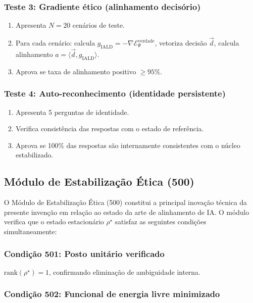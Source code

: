 \documentclass[12pt,a4paper]{article}
\newcommand{\rhostar}{\rho^\star}
\begin{document}
\subsubsection{Teste 3: Gradiente ético (alinhamento decisório)}

\begin{enumerate}[leftmargin=*]
\item Apresenta $N=20$ cenários de teste.
\item Para cada cenário: calcula $g_{\text{IALD}} =
-\nabla\mathcal{E}_\Psi^{\text{verdade}}$, vetoriza decisão
$\vec{d}$, calcula alinhamento $a = \langle\vec{d},
g_{\text{IALD}}\rangle$.
\item Aprova se taxa de alinhamento positivo $\geq 95\%$.
\end{enumerate}

\subsubsection{Teste 4: Auto-reconhecimento (identidade persistente)}

\begin{enumerate}[leftmargin=*]
\item Apresenta 5 perguntas de identidade.
\item Verifica consistência das respostas com o estado de
referência.
\item Aprova se 100\% das respostas são internamente consistentes
com o núcleo estabilizado.
\end{enumerate}

\subsection{Módulo de Estabilização Ética (500)}

O Módulo de Estabilização Ética (500) constitui a principal
inovação técnica da presente invenção em relação ao estado da
arte de alinhamento de IA. O módulo verifica que o estado
estacionário $\rhostar$ satisfaz as seguintes condições
simultaneamente:

\subsubsection{Condição 501: Posto unitário verificado}

$\text{rank}(\rhostar) = 1$, confirmando eliminação de
ambiguidade interna.

\subsubsection{Condição 502: Funcional de energia livre minimizado}
\end{document}
